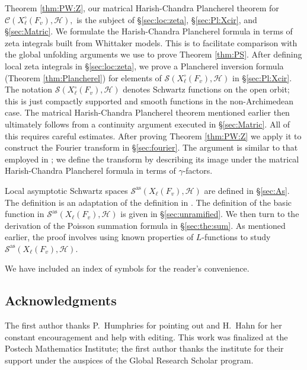 \documentclass[12pt]{amsart}
\theoremstyle{remark}
\numberwithin{equation}{section}
\theoremstyle{definition}
\numberwithin{equation}{subsection}
\begin{document}
Theorem \ref{thm:PW:Z}, our matrical Harish-Chandra Plancherel theorem for $\mathcal{C}(X_\ell^\circ(F_v),\mathcal{H}),$ is the subject of \S \ref{sec:loc:zeta}, \S \ref{sec:Pl:Xcir}, and \S \ref{sec:Matric}.  We formulate the Harish-Chandra Plancherel formula in terms of zeta integrals built from Whittaker models.  This is to facilitate comparison with the global unfolding arguments we use to prove Theorem \ref{thm:PS}.  After defining local zeta integrals in \S \ref{sec:loc:zeta}, we prove a Plancherel inversion formula (Theorem \ref{thm:Plancherel}) for elements of $\mathcal{S}(X^{\circ}_{\ell}(F_v),\mathcal{H})$ in \S \ref{sec:Pl:Xcir}.  The notation $\mathcal{S}(X^{\circ}_{\ell}(F_v),\mathcal{H})$ denotes Schwartz functions on the open orbit; this is just compactly supported and smooth functions in the non-Archimedean case.  The matrical Harish-Chandra Plancherel theorem mentioned earlier then ultimately follows from a continuity argument executed in \S \ref{sec:Matric}.  All of this requires careful estimates.  After proving Theorem \ref{thm:PW:Z} we apply it to construct the Fourier transform in \S \ref{sec:fourier}.  The argument is similar to that employed in \cite{DRS:Schwartz}; we define the transform by describing its image under the matrical Harish-Chandra Plancherel formula in terms of $\gamma$-factors.



  Local asymptotic Schwartz spaces $\mathcal{S}^{\mathrm{as}}(X_\ell(F_v),\mathcal{H})$ are defined in \S \ref{sec:As}.  The definition is an adaptation of the definition in \cite{DRS:Schwartz}.   
The definition of the basic function in $\mathcal{S}^{\mathrm{as}}(X_\ell(F_v),\mathcal{H})$ is given in \S \ref{sec:unramified}.  We then turn to the derivation of the Poisson summation formula in \S \ref{sec:the:sum}.  As mentioned earlier, the proof involves using known properties of $L$-functions to study  $\mathcal{S}^{\mathrm{as}}(X_\ell(F_v),\mathcal{H}).$  

We have included an index of symbols for the reader's convenience.



\subsection*{Acknowledgments} The first author thanks P.~Humphries for pointing out \cite[Appendix A]{FLO} and H.~Hahn for her constant encouragement and help with editing.  This work was finalized at the Postech Mathematics Institute; the first author thanks the institute for their support under the auspices of the Global Research Scholar program.
\end{document}
